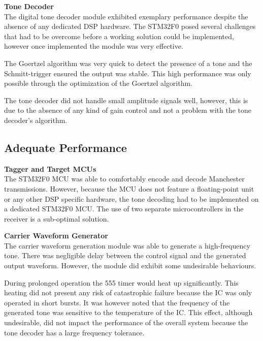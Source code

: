 \textbf{Tone Decoder}\\ %
The digital tone decoder module exhibited exemplary performance despite the absence of any dedicated DSP hardware. The STM32F0 posed several challenges that had to be overcome before a working solution could be implemented, however once implemented the module was very effective.

The Goertzel algorithm was very quick to detect the presence of a tone and the Schmitt-trigger ensured the output was stable. This high performance was only possible through the optimization of the Goertzel algorithm.

The tone decoder did not handle small amplitude signals well, however, this is due to the absence of any kind of gain control and not a problem with the tone decoder's algorithm.

\subsection{Adequate Performance}

\textbf{Tagger and Target MCUs}\\
The STM32F0 MCU was able to comfortably encode and decode Manchester transmissions. However, because the MCU does not feature a floating-point unit or any other DSP specific hardware, the tone decoding had to be implemented on a dedicated STM32F0 MCU. The use of two separate microcontrollers in the receiver is a sub-optimal solution.


\textbf{Carrier Waveform Generator}\\
The carrier waveform generation module was able to generate a high-frequency tone. There was negligible delay between the control signal and the generated output waveform. However, the module did exhibit some undesirable behaviours.

During prolonged operation the 555 timer would heat up significantly. This heating did not present any risk of catastrophic failure because the IC was only operated in short bursts. It was however noted that the frequency of the generated tone was sensitive to the temperature of the IC. This effect, although undesirable, did not impact the performance of the overall system because the tone decoder has a large frequency tolerance. 

